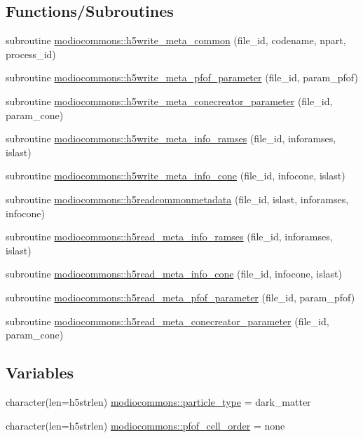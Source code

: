 \subsection*{Functions/\+Subroutines}
\begin{DoxyCompactItemize}
\item 
subroutine \hyperlink{namespacemodiocommons_a34d5806274712591a9d885c1d926af57}{modiocommons\+::h5write\+\_\+meta\+\_\+common} (file\+\_\+id, codename, npart, process\+\_\+id)
\item 
subroutine \hyperlink{namespacemodiocommons_a27eabdb687af381e608f120d19dfa997}{modiocommons\+::h5write\+\_\+meta\+\_\+pfof\+\_\+parameter} (file\+\_\+id, param\+\_\+pfof)
\item 
subroutine \hyperlink{namespacemodiocommons_a703d00d2ec9c6abb9e8bdfc19164d1f1}{modiocommons\+::h5write\+\_\+meta\+\_\+conecreator\+\_\+parameter} (file\+\_\+id, param\+\_\+cone)
\item 
subroutine \hyperlink{namespacemodiocommons_aa0393a317c75eb21189d5d381c3cf591}{modiocommons\+::h5write\+\_\+meta\+\_\+info\+\_\+ramses} (file\+\_\+id, inforamses, islast)
\item 
subroutine \hyperlink{namespacemodiocommons_afee94c7a833034224dee17e9055971e4}{modiocommons\+::h5write\+\_\+meta\+\_\+info\+\_\+cone} (file\+\_\+id, infocone, islast)
\item 
subroutine \hyperlink{namespacemodiocommons_a303306d620ca4d1ab28ec77613894994}{modiocommons\+::h5readcommonmetadata} (file\+\_\+id, islast, inforamses, infocone)
\item 
subroutine \hyperlink{namespacemodiocommons_afc9749d51b153c5440af3eda2ab6ad79}{modiocommons\+::h5read\+\_\+meta\+\_\+info\+\_\+ramses} (file\+\_\+id, inforamses, islast)
\item 
subroutine \hyperlink{namespacemodiocommons_a25748f3d836657a0319b3dd68c998cab}{modiocommons\+::h5read\+\_\+meta\+\_\+info\+\_\+cone} (file\+\_\+id, infocone, islast)
\item 
subroutine \hyperlink{namespacemodiocommons_ae46bb6ff0e0c35fd94b37c82fa3e7d7c}{modiocommons\+::h5read\+\_\+meta\+\_\+pfof\+\_\+parameter} (file\+\_\+id, param\+\_\+pfof)
\item 
subroutine \hyperlink{namespacemodiocommons_a2a3dda6a7e2900f5c81695641e65b966}{modiocommons\+::h5read\+\_\+meta\+\_\+conecreator\+\_\+parameter} (file\+\_\+id, param\+\_\+cone)
\end{DoxyCompactItemize}
\subsection*{Variables}
\begin{DoxyCompactItemize}
\item 
character(len=h5strlen) \hyperlink{namespacemodiocommons_a4633abb26c30930181f911f19ff14d48}{modiocommons\+::particle\+\_\+type} = \textquotesingle{}dark\+\_\+matter\textquotesingle{}
\item 
character(len=h5strlen) \hyperlink{namespacemodiocommons_af6e5c22c5b9117c05a89375348ba830f}{modiocommons\+::pfof\+\_\+cell\+\_\+order} = \textquotesingle{}none\textquotesingle{}
\end{DoxyCompactItemize}
